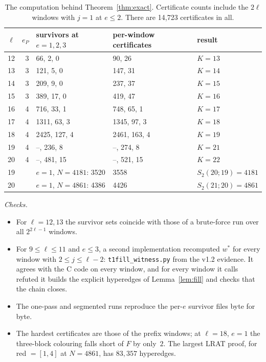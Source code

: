\documentclass[11pt]{amsart}
\theoremstyle{definition}
\newcommand{\F}{F}
\newcommand{\Stwo}{S_2}
\begin{document}
\begin{table}[ht]
\centering\small
\begin{tabular}{rrlll}
\toprule
$\ell$ & $e_P$ & survivors at $e=1,2,3$ & per-window certificates & result\\
\midrule
12 & 3 & 66, 2, 0 & 90, 26 & $K=13$\\
13 & 3 & 121, 5, 0 & 147, 31 & $K=14$\\
14 & 3 & 209, 9, 0 & 237, 37 & $K=15$\\
15 & 3 & 389, 17, 0 & 419, 47 & $K=16$\\
16 & 4 & 716, 33, 1 & 748, 65, 1 & $K=17$\\
17 & 4 & 1311, 63, 3 & 1345, 97, 3 & $K=18$\\
18 & 4 & 2425, 127, 4 & 2461, 163, 4 & $K=19$\\
19 & 4 & --, 236, 8 & --, 274, 8 & $K=21$\\
20 & 4 & --, 481, 15 & --, 521, 15 & $K=22$\\
\midrule
19 & & $e=1$, $N=4181$: 3520 & 3558 & $\Stwo(20;19)=4181$\\
20 & & $e=1$, $N=4861$: 4386 & 4426 & $\Stwo(21;20)=4861$\\
\bottomrule
\end{tabular}
\caption{The computation behind Theorem~\ref{thm:exact}. Certificate counts include the $2\ell$ windows with $j=1$ at $e\le2$. There are 14{,}723 certificates in all.}\label{tab:exact}
\end{table}

\noindent\emph{Checks.}
\begin{itemize}
\item For $\ell=12,13$ the survivor sets coincide with those of a brute-force run over all $2^{2\ell-1}$ windows.
\item For $9\le\ell\le11$ and $e\le3$, a second implementation recomputed $w^*$ for every window with $2\le j\le\ell-2$: \texttt{t1fill\_witness.py} from the v1.2 evidence. It agrees with the C code on every window, and for every window it calls refuted it builds the explicit hyperedges of Lemma~\ref{lem:fill} and checks that the chain closes.
\item The one-pass and segmented runs reproduce the per-$e$ survivor files byte for byte.
\item The hardest certificates are those of the prefix windows; at $\ell=18$, $e=1$ the three-block colouring falls short of $\F$ by only~$2$. The largest LRAT proof, for red $=[1,4]$ at $N=4861$, has $83{,}357$ hyperedges.
\end{itemize}
\end{document}
